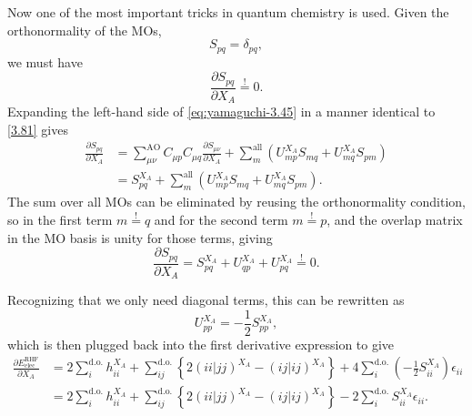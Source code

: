 \documentclass[%
class = book,%
crop = false,%
float = true,%
multi = true,%
preview = false,%
]{standalone}
\begin{document}
Now one of the most important tricks in quantum chemistry is used. Given the orthonormality of the MOs,
\begin{equation}
S_{pq} = \delta_{pq}, \tag{Yamaguchi eq. 3.44}
\end{equation}
we must have
\begin{equation}
  \label{eq:yamaguchi-3.45}\tag{Yamaguchi eq. 3.45}
  \frac{\partial S_{pq}}{\partial X_{A}} \overset{!}{=} 0.
\end{equation}
Expanding the left-hand side of \eqref{eq:yamaguchi-3.45} in a manner identical to \eqref{3.81} gives
\begin{align*}
\frac{\partial S_{pq}}{\partial X_{A}} &= \sum_{\mu\nu}^{\text{AO}} C_{\mu p} C_{\mu q} \frac{\partial S_{\mu\nu}}{\partial X_{A}} + \sum_{m}^{\text{all}} \left( U_{mp}^{X_{A}} S_{mq} + U_{mq}^{X_{A}} S_{pm} \right) \tag{Yamaguchi eqs. 3.40 + 3.43} \\
                                       &= S_{pq}^{X_{A}} + \sum_{m}^{\text{all}} \left( U_{mp}^{X_{A}} S_{mq} + U_{mq}^{X_{A}} S_{pm} \right). \tag{Yamaguchi eq. 3.43}
\end{align*}
The sum over all MOs can be eliminated by reusing the orthonormality condition, so in the first term \(m \overset{!}{=} q\) and for the second term \(m \overset{!}{=} p\), and the overlap matrix in the MO basis is unity for those terms, giving
\begin{equation}
  \frac{\partial S_{pq}}{\partial X_{A}} = S_{pq}^{X_{A}} + U_{qp}^{X_{A}} + U_{pq}^{X_{A}} \overset{!}{=} 0. \tag{Yamaguchi eq. 3.46}
\end{equation}

Recognizing that we only need diagonal terms, this can be rewritten as
\begin{equation}
  U_{pp}^{X_{A}} = -\frac{1}{2} S_{pp}^{X_{A}}, \tag{Yamaguchi eq. 4.20}
\end{equation}
which is then plugged back into the first derivative expression to give
\begin{align*}
  \frac{\partial E_{\text{elec}}^{\text{RHF}}}{\partial X_{A}} &= 2 \sum_{i}^{\text{d.o.}} h_{ii}^{X_{A}} + \sum_{ij}^{\text{d.o.}} \left\{ 2(ii|jj)^{X_{A}} - (ij|ij)^{X_{A}} \right\} + 4 \sum_{i}^{\text{d.o.}} \left( -\frac{1}{2} S_{ii}^{X_{A}} \right) \epsilon_{ii} \\
                                                  &= 2 \sum_{i}^{\text{d.o.}} h_{ii}^{X_{A}} + \sum_{ij}^{\text{d.o.}} \left\{ 2(ii|jj)^{X_{A}} - (ij|ij)^{X_{A}} \right\} - 2 \sum_{i}^{\text{d.o.}} S_{ii}^{X_{A}} \epsilon_{ii}. \label{eq:yamaguchi-4.21-rederived}\tag{Yamaguchi eq. 4.21 [rederived]}
\end{align*}
\end{document}
